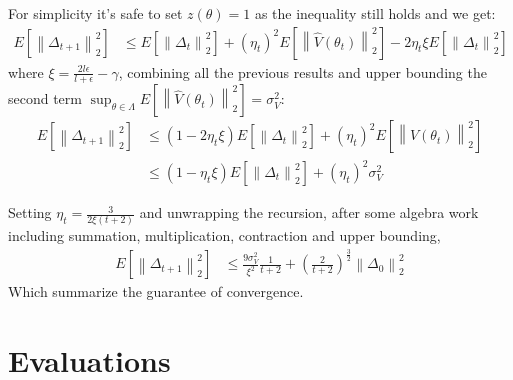 \documentclass{beamer}
\begin{document}
\begin{frame}
 
   For simplicity it's safe to set $z(\theta) = 1$ as the inequality still holds and we get: 
   \begin{equation}
     \begin{aligned}
     E[ \left\lVert\Delta_{t+1}\right\lVert_2^2 ] & \leq E[\left\lVert\Delta_{t}\right\lVert_2^2] + (\eta_t)^2 E[\left\lVert\hat{V}(\theta_{t})\right\lVert_2^2] - 2\eta_t \xi E[\left\lVert\Delta_t \right\lVert_2^2]  \nonumber
      \end{aligned}
    \end{equation}
   where $\xi = \frac{2l\epsilon}{l+\epsilon} - \gamma$, combining all the previous results and upper bounding the second term $\sup_{\theta \in \Lambda}E[\left\lVert\hat{V}(\theta_{t})\right\lVert_2^2] = \sigma_{V}^2$:
   \begin{equation}
     \begin{aligned}
     E[ \left\lVert\Delta_{t+1}\right\lVert_2^2 ] & \leq (1 - 2\eta_t \xi)E[\left\lVert\Delta_{t}\right\lVert_2^2] + (\eta_t)^2 E[\left\lVert\hat{V}(\theta_{t})\right\lVert_2^2] \nonumber \\
   & \leq   (1 - \eta_t \xi)E[\left\lVert\Delta_{t}\right\lVert_2^2] + (\eta_t)^2 \sigma_{V}^2 \nonumber 
     \end{aligned}
   \end{equation}
  \end{frame}
  \begin{frame}
   Setting $\eta_t =\frac{3}{2\xi(t+2)}$ and unwrapping the recursion, after some algebra work including summation, multiplication, contraction and upper bounding,
   \begin{equation}
     \begin{aligned}
     E[ \left\lVert\Delta_{t+1}\right\lVert_2^2 ] &\leq \frac{9\sigma_{V}^2}{\xi^2} \frac{1}{t+2} + (\frac{2}{t+2})^{\frac{3}{2}} \left\lVert\Delta_{0}\right\lVert_2^2
     \end{aligned}
   \end{equation}
   Which summarize the guarantee of convergence.
\end{frame}


\section{Evaluations}
\end{document}
